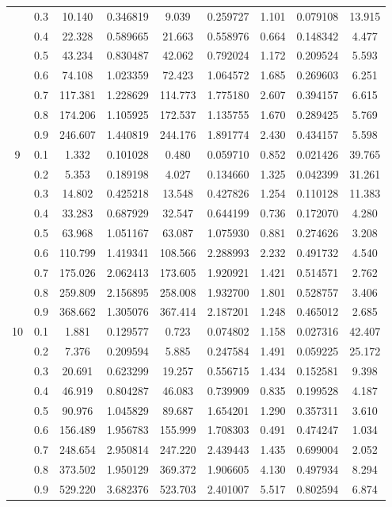 \begin{longtable}{ | c | c || c | c | c | c | c | c | c | }
 & 0.3 & 10.140 & 0.346819 & 9.039 & 0.259727 & 1.101 & 0.079108 & 13.915 \\
 & 0.4 & 22.328 & 0.589665 & 21.663 & 0.558976 & 0.664 & 0.148342 & 4.477 \\
 & 0.5 & 43.234 & 0.830487 & 42.062 & 0.792024 & 1.172 & 0.209524 & 5.593 \\
 & 0.6 & 74.108 & 1.023359 & 72.423 & 1.064572 & 1.685 & 0.269603 & 6.251 \\
 & 0.7 & 117.381 & 1.228629 & 114.773 & 1.775180 & 2.607 & 0.394157 & 6.615 \\
 & 0.8 & 174.206 & 1.105925 & 172.537 & 1.135755 & 1.670 & 0.289425 & 5.769 \\
 & 0.9 & 246.607 & 1.440819 & 244.176 & 1.891774 & 2.430 & 0.434157 & 5.598 \\
 \hline
\multirow{9}{*}{9} & 0.1 & 1.332 & 0.101028 & 0.480 & 0.059710 & 0.852 & 0.021426 & 39.765 \\
 & 0.2 & 5.353 & 0.189198 & 4.027 & 0.134660 & 1.325 & 0.042399 & 31.261 \\
 & 0.3 & 14.802 & 0.425218 & 13.548 & 0.427826 & 1.254 & 0.110128 & 11.383 \\
 & 0.4 & 33.283 & 0.687929 & 32.547 & 0.644199 & 0.736 & 0.172070 & 4.280 \\
 & 0.5 & 63.968 & 1.051167 & 63.087 & 1.075930 & 0.881 & 0.274626 & 3.208 \\
 & 0.6 & 110.799 & 1.419341 & 108.566 & 2.288993 & 2.232 & 0.491732 & 4.540 \\
 & 0.7 & 175.026 & 2.062413 & 173.605 & 1.920921 & 1.421 & 0.514571 & 2.762 \\
 & 0.8 & 259.809 & 2.156895 & 258.008 & 1.932700 & 1.801 & 0.528757 & 3.406 \\
 & 0.9 & 368.662 & 1.305076 & 367.414 & 2.187201 & 1.248 & 0.465012 & 2.685 \\
 \hline
\multirow{9}{*}{10} & 0.1 & 1.881 & 0.129577 & 0.723 & 0.074802 & 1.158 & 0.027316 & 42.407 \\
 & 0.2 & 7.376 & 0.209594 & 5.885 & 0.247584 & 1.491 & 0.059225 & 25.172 \\
 & 0.3 & 20.691 & 0.623299 & 19.257 & 0.556715 & 1.434 & 0.152581 & 9.398 \\
 & 0.4 & 46.919 & 0.804287 & 46.083 & 0.739909 & 0.835 & 0.199528 & 4.187 \\
 & 0.5 & 90.976 & 1.045829 & 89.687 & 1.654201 & 1.290 & 0.357311 & 3.610 \\
 & 0.6 & 156.489 & 1.956783 & 155.999 & 1.708303 & 0.491 & 0.474247 & 1.034 \\
 & 0.7 & 248.654 & 2.950814 & 247.220 & 2.439443 & 1.435 & 0.699004 & 2.052 \\
 & 0.8 & 373.502 & 1.950129 & 369.372 & 1.906605 & 4.130 & 0.497934 & 8.294 \\
 & 0.9 & 529.220 & 3.682376 & 523.703 & 2.401007 & 5.517 & 0.802594 & 6.874 \\
 \hline
\hline
\end{longtable}
 
